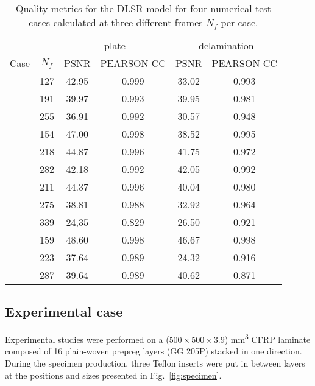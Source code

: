 \begin{table}[!h]
	\centering \footnotesize
	\caption{Quality metrics for the DLSR model for four numerical test cases calculated at three different frames $N_f$ per case.}	
	\begin{tabular}{lccccc}
		\toprule
		& & \multicolumn{2}{c}{plate} & \multicolumn{2}{c}{delamination} \\
		\cmidrule(lr){3-4} \cmidrule(lr){5-6}
		Case & $N_f$ & PSNR & PEARSON CC & PSNR & PEARSON CC \\ 
		\midrule
		\multirow{3}{*}{}  & 127  & 42.95 & 0.999 & 33.02 & 0.993 \\
		\multirow{3}{*}{} 1 & 191  & 39.97 & 0.993 & 39.95 & 0.981 \\
		\multirow{3}{*}{}  & 255 & 36.91 & 0.992 & 30.57 & 0.948 \\ 
		\midrule
		\multirow{3}{*}{}  & 154 & 47.00 & 0.998 & 38.52 & 0.995 \\
		\multirow{3}{*}{} 2 & 218 & 44.87 & 0.996 & 41.75 & 0.972\\
		\multirow{3}{*}{}  & 282 & 42.18 & 0.992 & 42.05 & 0.992 \\ 
		\midrule
		\multirow{3}{*}{}  & 211 & 44.37 & 0.996 & 40.04 & 0.980 \\
		\multirow{3}{*}{} 3 & 275 & 38.81 & 0.988 & 32.92 & 0.964 \\
		\multirow{3}{*}{}  & 339 & 24,35 & 0.829 & 26.50 & 0.921 \\ 
		\midrule
		\multirow{3}{*}{}  & 159 & 48.60 & 0.998 & 46.67 & 0.998 \\
		\multirow{3}{*}{} 4 & 223 & 37.64 & 0.989 & 24.32 & 0.916 \\
		\multirow{3}{*}{}  & 287 & 39.64 & 0.989 & 40.62 & 0.871 \\ 		
		\bottomrule
	\end{tabular}
	\label{tab:num_DLSR_results}
\end{table}

\clearpage

\subsection{Experimental case}
\label{sec542}
Experimental studies were performed on a ($500 \times 500\times 3.9$) mm\textsuperscript{3} CFRP laminate composed of 16 plain-woven prepreg layers (GG 205P) stacked in one direction. 
During the specimen production, three Teflon inserts were put in between layers at the positions and sizes presented in Fig.~\ref{fig:specimen}.

